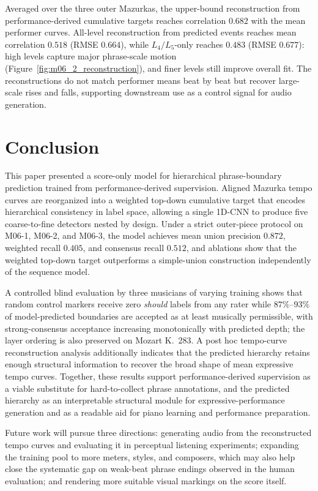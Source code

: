 \documentclass{article}
\begin{document}
Averaged over the three outer Mazurkas, the upper-bound reconstruction from performance-derived cumulative targets reaches correlation $0.682$ with the mean performer curves. All-level reconstruction from predicted events reaches mean correlation $0.518$ (RMSE $0.664$), while $L_4/L_5$-only reaches $0.483$ (RMSE $0.677$): high levels capture major phrase-scale motion (Figure~\ref{fig:m06_2_reconstruction}), and finer levels still improve overall fit. The reconstructions do not match performer means beat by beat but recover large-scale rises and falls, supporting downstream use as a control signal for audio generation.

\section{Conclusion}\label{sec:conclusion}

This paper presented a score-only model for hierarchical phrase-boundary prediction trained from performance-derived supervision. Aligned Mazurka tempo curves are reorganized into a weighted top-down cumulative target that encodes hierarchical consistency in label space, allowing a single 1D-CNN to produce five coarse-to-fine detectors nested by design. Under a strict outer-piece protocol on M06-1, M06-2, and M06-3, the model achieves mean union precision $0.872$, weighted recall $0.405$, and consensus recall $0.512$, and ablations show that the weighted top-down target outperforms a simple-union construction independently of the sequence model.

A controlled blind evaluation by three musicians of varying training shows that random control markers receive zero \emph{should} labels from any rater while $87\%$--$93\%$ of model-predicted boundaries are accepted as at least musically permissible, with strong-consensus acceptance increasing monotonically with predicted depth; the layer ordering is also preserved on Mozart K.~283. A post hoc tempo-curve reconstruction analysis additionally indicates that the predicted hierarchy retains enough structural information to recover the broad shape of mean expressive tempo curves. Together, these results support performance-derived supervision as a viable substitute for hard-to-collect phrase annotations, and the predicted hierarchy as an interpretable structural module for expressive-performance generation and as a readable aid for piano learning and performance preparation.

Future work will pursue three directions: generating audio from the reconstructed tempo curves and evaluating it in perceptual listening experiments; expanding the training pool to more meters, styles, and composers, which may also help close the systematic gap on weak-beat phrase endings observed in the human evaluation; and rendering more suitable visual markings on the score itself.


\end{document}
